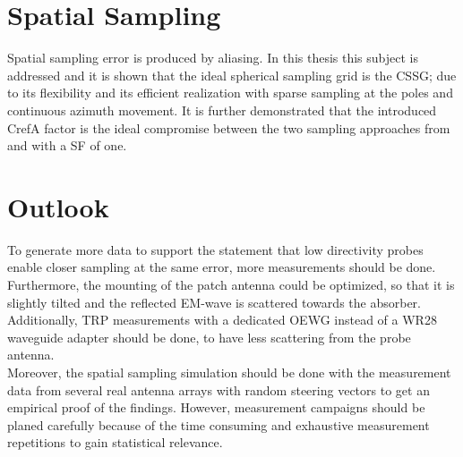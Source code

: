 \section{Spatial Sampling}

Spatial sampling error is produced by aliasing. In this thesis this subject is addressed and it is shown that the ideal spherical sampling grid is the \acf{CSSG}; due to its flexibility and its efficient realization with sparse sampling at the poles and continuous azimuth movement. It is further demonstrated that the introduced \ac{CrefA} factor is the ideal compromise between the two sampling approaches from \cite{hansen} and \cite{2018arXiv180310993F} with a \acf{SF} of one.

\section{Outlook}

To generate more data to support the statement that low directivity probes enable closer sampling at the same error, more measurements should be done. Furthermore, the mounting of the patch antenna could be optimized, so that it is slightly tilted and the reflected \acf{EM}-wave is scattered towards the absorber. Additionally, \ac{TRP} measurements with a dedicated \ac{OEWG} instead of a WR28 waveguide adapter should be done, to have less scattering from the probe antenna.\\
Moreover, the spatial sampling simulation should be done with the measurement data from several real antenna arrays with random steering vectors to get an empirical proof of the findings. However, measurement campaigns should be planed carefully because of the time consuming and exhaustive measurement repetitions to gain statistical relevance.